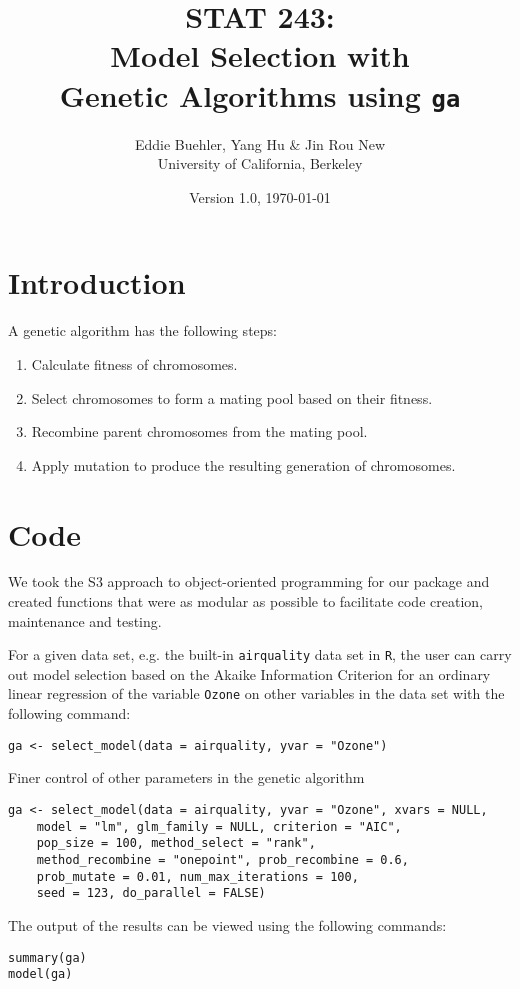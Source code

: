 \documentclass[11pt]{article}
\title{STAT 243: \\
	Model Selection with\\ 
	Genetic Algorithms using \texttt{ga}}
\author{Eddie Buehler, Yang Hu \& Jin Rou New\\
	University of California, Berkeley}
\date{Version 1.0, \today}
\begin{document}
\maketitle

\section{Introduction}
A genetic algorithm has the following steps: 
\begin{enumerate}
	\item Calculate fitness of chromosomes.
	\item Select chromosomes to form a mating pool based on their fitness.
	\item Recombine parent chromosomes from the mating pool.
	\item Apply mutation to produce the resulting generation of chromosomes.
\end{enumerate}

\section{Code}
We took the S3 approach to object-oriented programming for our package and created functions that were as modular as possible to facilitate code creation, maintenance and testing.

For a given data set, e.g. the built-in \texttt{airquality} data set in \texttt{R}, the user can carry out model selection based on the Akaike Information Criterion for an ordinary linear regression of the variable \texttt{Ozone} on other variables in the data set with the following command:

\begin{verbatim}
ga <- select_model(data = airquality, yvar = "Ozone")
\end{verbatim}

Finer control of other parameters in the genetic algorithm 
\begin{verbatim}
ga <- select_model(data = airquality, yvar = "Ozone", xvars = NULL,
	model = "lm", glm_family = NULL, criterion = "AIC",
	pop_size = 100, method_select = "rank",
	method_recombine = "onepoint", prob_recombine = 0.6,
	prob_mutate = 0.01, num_max_iterations = 100,
	seed = 123, do_parallel = FALSE)
\end{verbatim}

The output of the results can be viewed using the following commands:
\begin{verbatim}
summary(ga)
model(ga)
\end{verbatim}
\end{document}

